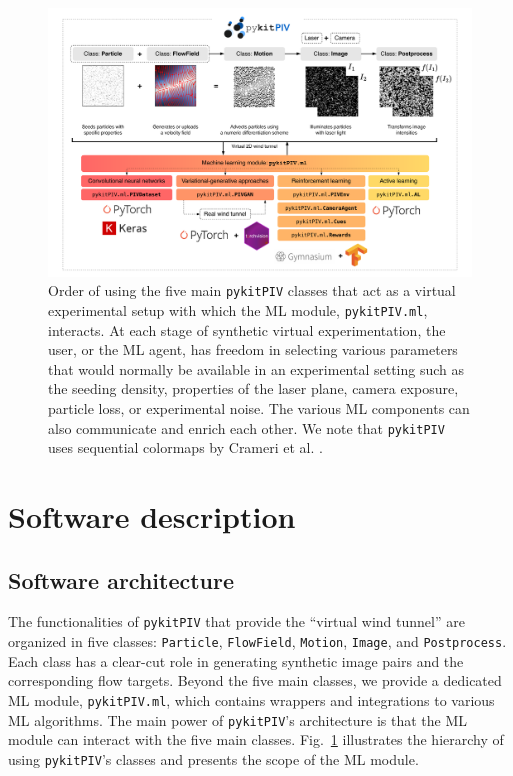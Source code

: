\documentclass[a4paper,fleqn]{cas-dc}
\begin{document}
\begin{figure}[t]
\centering
\vspace{-0.4 in}
\includegraphics[width=\textwidth]{pykitPIV-modules.pdf}
\vspace{10 pt}
\caption{\footnotesize Order of using the five main \texttt{pykitPIV} classes that act as a virtual experimental setup with which the ML module, \texttt{pykitPIV.ml}, interacts. At each stage of synthetic virtual experimentation, the user, or the ML agent, has freedom in selecting various parameters that would normally be available in an experimental setting such as the seeding density, properties of the laser plane, camera exposure, particle loss, or experimental noise. The various ML components can also communicate and enrich each other. We note that \texttt{pykitPIV} uses sequential colormaps by Crameri et al. \cite{crameri2020misuse}.}
\label{fig:pykitPIV-overview}
\end{figure}

\section{Software description} \label{sec:software}

\subsection{Software architecture}

The functionalities of \texttt{pykitPIV} that provide the ``virtual wind tunnel'' are organized in five classes: \texttt{Particle}, \texttt{FlowField}, \texttt{Motion}, \texttt{Image}, and \texttt{Postprocess}. Each class has a clear-cut role in generating synthetic image pairs and the corresponding flow targets. Beyond the five main classes, we provide a dedicated ML module, \texttt{pykitPIV.ml}, which contains wrappers and integrations to various ML algorithms. The main power of \texttt{pykitPIV}'s architecture is that the ML module can interact with the five main classes. Fig.~\ref{fig:pykitPIV-overview} illustrates the hierarchy of using \texttt{pykitPIV}'s classes and presents the scope of the ML module.
\end{document}
